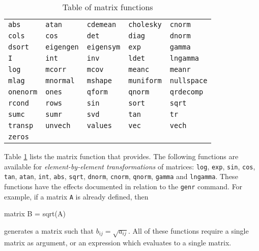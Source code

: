 \begin{table}[htbp]
\centering
\begin{tabular}{lllll}
\texttt{abs}       &
\texttt{atan}      &
\texttt{cdemean}   &
\texttt{cholesky}  &
\texttt{cnorm}     \\
\texttt{cols}      &
\texttt{cos}       &
\texttt{det}       &
\texttt{diag}      &
\texttt{dnorm}     \\
\texttt{dsort}     &
\texttt{eigengen}  &
\texttt{eigensym}  &
\texttt{exp}       &
\texttt{gamma}     \\
\texttt{I}         &
\texttt{int}       &
\texttt{inv}       &
\texttt{ldet}      &
\texttt{lngamma}   \\
\texttt{log}       &
\texttt{mcorr}     &
\texttt{mcov}      &
\texttt{meanc}     &
\texttt{meanr}     \\
\texttt{mlag}      &
\texttt{mnormal}   &
\texttt{mshape}    &
\texttt{muniform}  &
\texttt{nullspace} \\
\texttt{onenorm}   &
\texttt{ones}      &
\texttt{qform}     &
\texttt{qnorm}     &
\texttt{qrdecomp}  \\
\texttt{rcond}     &
\texttt{rows}      &
\texttt{sin}       &
\texttt{sort}      &
\texttt{sqrt}      \\
\texttt{sumc}      &
\texttt{sumr}      &
\texttt{svd}       &
\texttt{tan}       &
\texttt{tr}        \\
\texttt{transp}    &
\texttt{unvech}    &
\texttt{values}    &
\texttt{vec}       &
\texttt{vech}      \\
\texttt{zeros}     \\

\end{tabular}      
\caption{Table of matrix functions}
\label{tab:matrix_funcs}
\end{table}

Table \ref{tab:matrix_funcs} lists the matrix function that
 provides. The following functions are available for
\textit{element-by-element transformations} of matrices: \texttt{log},
\texttt{exp}, \texttt{sin}, \texttt{cos}, \texttt{tan}, \texttt{atan},
\texttt{int}, \texttt{abs}, \texttt{sqrt}, \texttt{dnorm},
\texttt{cnorm}, \texttt{qnorm}, \texttt{gamma} and \texttt{lngamma}.
These functions have the effects documented in relation to the
\texttt{genr} command.  For example, if a matrix \texttt{A} is already
defined, then
%
\begin{code}
matrix B = sqrt(A)
\end{code}
%
generates a matrix such that $b_{ij} = \sqrt{a_{ij}}$.  All of these
functions require a single matrix as argument, or an expression which
evaluates to a single matrix.

